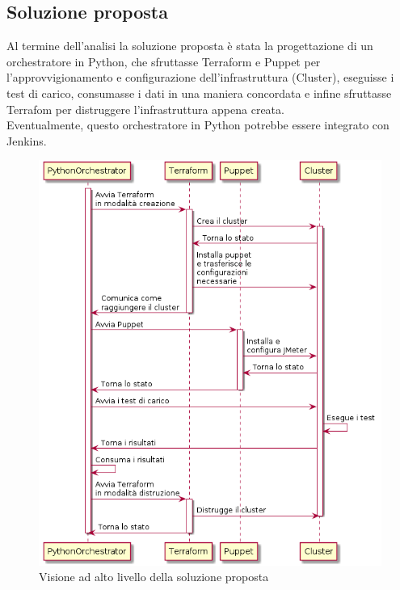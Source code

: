 \subsection{Soluzione proposta}
Al termine dell'analisi la soluzione proposta è stata la progettazione di un orchestratore in Python, che sfruttasse Terraform e Puppet per l'approvvigionamento e configurazione dell'infrastruttura (Cluster), eseguisse i test di carico, consumasse i dati in una maniera concordata e infine sfruttasse Terrafom per distruggere l'infrastruttura appena creata. \\
Eventualmente, questo orchestratore in Python potrebbe essere integrato con Jenkins.
\begin{figure}[H]
	\centering
	\includegraphics[width=13cm]{immagini/soluzione}
	\caption{Visione ad alto livello della soluzione proposta}
	\label{img-soluzione}
\end{figure}
